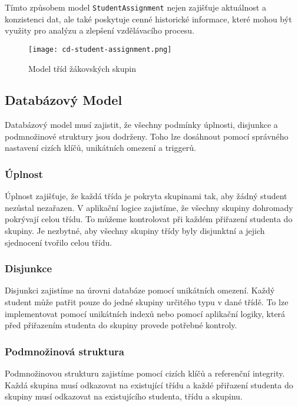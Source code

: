 Tímto způsobem model \texttt{StudentAssignment} nejen zajišťuje aktuálnost a konzistenci dat, ale také poskytuje cenné historické informace, které mohou být využity pro analýzu a zlepšení vzdělávacího procesu.

\begin{figure}[H]
    \centering
    \texttt{[image: cd-student-assignment.png]}
    \caption{Model tříd žákovských skupin}
    \label{fig:cd-student-assignment}
 \end{figure}

\subsection*{Databázový Model}

Databázový model musí zajistit, že všechny podmínky úplnosti, disjunkce a podmnožinové struktury jsou dodrženy. Toho lze dosáhnout pomocí správného nastavení cizích klíčů, unikátních omezení a triggerů.

\subsubsection*{Úplnost}

Úplnost zajišťuje, že každá třída je pokryta skupinami tak, aby žádný student nezůstal nezařazen. V aplikační logice zajistíme, že všechny skupiny dohromady pokrývají celou třídu. To můžeme kontrolovat při každém přiřazení studenta do skupiny. Je nezbytné, aby všechny skupiny třídy byly disjunktní a jejich sjednocení tvořilo celou třídu.

\subsubsection*{Disjunkce}

Disjunkci zajistíme na úrovni databáze pomocí unikátních omezení. Každý student může patřit pouze do jedné skupiny určitého typu v dané třídě. To lze implementovat pomocí unikátních indexů nebo pomocí aplikační logiky, která před přiřazením studenta do skupiny provede potřebné kontroly.

\subsubsection*{Podmnožinová struktura}

Podmnožinovou strukturu zajistíme pomocí cizích klíčů a referenční integrity. Každá skupina musí odkazovat na existující třídu a každé přiřazení studenta do skupiny musí odkazovat na existujícího studenta, třídu a skupinu.

